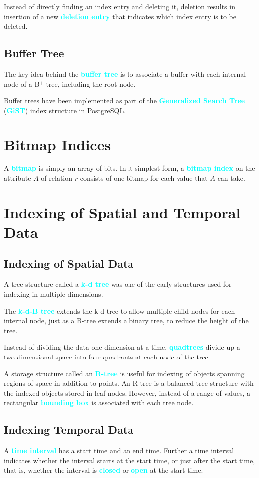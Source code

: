 \documentclass[a4paper,12pt,twoside,openany]{book}
\newcommand{\textcy}[1]{\textbf{\textcolor{cyan}{#1}}}
\begin{document}
Instead of directly finding an index entry and deleting it, deletion results in insertion of a new \textcy{deletion entry} that indicates which index entry is to be deleted.

\subsection{Buffer Tree}

The key idea behind the \textcy{buffer tree} is to associate a buffer with each internal node of a B$^+$-tree, including the root node.

Buffer trees have been implemented as part of the \textcy{Generalized Search Tree} (\textcy{GiST}) index structure in PostgreSQL.

\section{Bitmap Indices}

A \textcy{bitmap} is simply an array of bits. In it simplest form, a \textcy{bitmap index} on the attribute $A$ of relation $r$ consists of one bitmap for each value that $A$ can take.

\section{Indexing of Spatial and Temporal Data}
\subsection{Indexing of Spatial Data}

A tree structure called a \textcy{k-d tree} was one of the early structures used for indexing in multiple dimensions.

The \textcy{k-d-B tree} extends the k-d tree to allow multiple child nodes for each internal node, just as a B-tree extends a binary tree, to reduce the height of the tree.

Instead of dividing the data one dimension at a time, \textcy{quadtrees} divide up a two-dimensional space into four quadrants at each node of the tree.

A storage structure called an \textcy{R-tree} is useful for indexing of objects spanning regions of space in addition to points. An R-tree is a balanced tree structure with the indexed objects stored in leaf nodes. However, instead of a range of values, a rectangular \textcy{bounding box} is associated with each tree node.

\subsection{Indexing Temporal Data}

A \textcy{time interval} has a start time and an end time. Further a time interval indicates whether the interval starts at the start time, or just after the start time, that is, whether the interval is \textcy{closed} or \textcy{open} at the start time.

\end{document}
